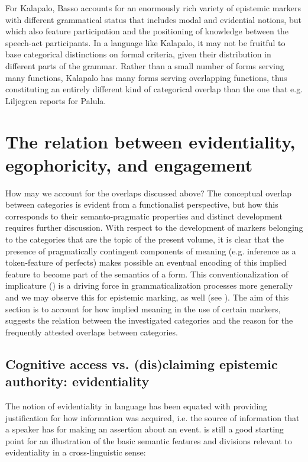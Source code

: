 \documentclass[output=paper]{langsci/langscibook}
\begin{document}
For Kalapalo, Basso accounts for an enormously rich variety of epistemic markers with different grammatical status that includes modal and evidential notions, but which also feature participation and the positioning of knowledge between the speech-act participants. In a language like Kalapalo, it may not be fruitful to base categorical distinctions on formal criteria, given their distribution in different parts of the grammar. Rather than a small number of forms serving many functions, Kalapalo has many forms serving overlapping functions, thus constituting an entirely different kind of categorical overlap than the one that e.g. Liljegren reports for Palula.
%
\section{The relation between evidentiality, egophoricity, and engagement}\label{s:hb3}

How may we account for the overlaps discussed above? The conceptual overlap between categories is evident from a functionalist perspective, but how this corresponds to their semanto-pragmatic properties and distinct development requires further discussion. With respect to the development of markers belonging to the categories that are the topic of the present volume, it is clear that the presence of pragmatically contingent components of meaning (e.g. inference as a token-feature of perfects) makes possible an eventual encoding of this implied feature to become part of the semantics of a form. This conventionalization of implicature (\citealt{Levinson2000}) is a driving force in grammaticalization processes more generally and we may observe this for epistemic marking, as well (see \citealt{Bergqvist2018b}). The aim of this section is to account for how implied meaning in the use of certain markers, suggests the relation between the investigated categories and the reason for the frequently attested overlaps between categories.
%
\subsection{Cognitive access vs. (dis)claiming epistemic authority: evidentiality}\label{s:hb3-1}

The notion of evidentiality in language has been equated with providing justification for how information was acquired, i.e. the source of information that a speaker has for making an assertion about an event. \cite{Willett1988} is still a good starting point for an illustration of the basic semantic features and divisions relevant to evidentiality in a cross-linguistic sense: 
%
\end{document}
